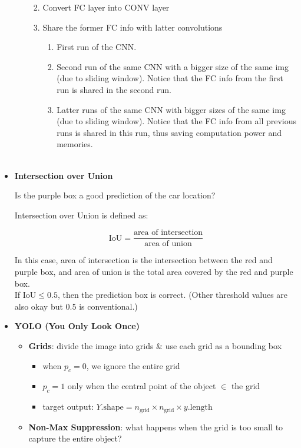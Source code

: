 \documentclass[
]{book}
\providecommand{\tightlist}{%
  \setlength{\itemsep}{0pt}\setlength{\parskip}{0pt}}
\begin{document}
\begin{itemize}
\begin{itemize}
    \begin{enumerate}
    \def\labelenumi{\arabic{enumi}.}
    \item
      Convert FC layer into CONV layer
    \item
      Share the former FC info with latter convolutions

      \begin{enumerate}
      \def\labelenumii{\arabic{enumii}.}
      \tightlist
      \item
        First run of the CNN.
      \item
        Second run of the same CNN with a bigger size of the same img
        (due to sliding window). Notice that the FC info from the first
        run is shared in the second run.
      \item
        Latter runs of the same CNN with bigger sizes of the same img
        (due to sliding window). Notice that the FC info from all
        previous runs is shared in this run, thus saving computation
        power and memories.\\
        ~\\
      \end{enumerate}
    \end{enumerate}
  \end{itemize}
\item
  \textbf{Intersection over Union}

  Is the purple box a good prediction of the car location?

  Intersection over Union is defined as:

  \[\begin{equation}
    \text{IoU}=\frac{\text{area of intersection}}{\text{area of union}}
    \end{equation}\]

  In this case, area of intersection is the intersection between the red
  and purple box, and area of union is the total area covered by the red
  and purple box.\\
  If \(\text{IoU}\leq 0.5\), then the prediction box is correct. (Other
  threshold values are also okay but 0.5 is conventional.)
\item
  \textbf{YOLO (You Only Look Once)}

  \begin{itemize}
  \item
    \textbf{Grids}: divide the image into grids \& use each grid as a
    bounding box

    \begin{itemize}
    \tightlist
    \item
      when \(p_c=0\), we ignore the entire grid
    \item
      \(p_c=1\) only when the central point of the object \(\in\) the
      grid
    \item
      target output:
      \(Y.\text{shape}=n_{\text{grid}}\times n_{\text{grid}}\times y.\text{length}\)\\
    \end{itemize}
  \item
    \textbf{Non-Max Suppression}: what happens when the grid is too
    small to capture the entire object?


\end{itemize}
\end{itemize}
\end{document}
